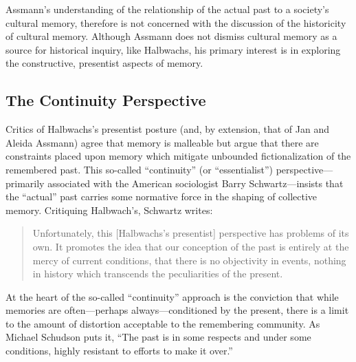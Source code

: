 Assmann's understanding of the relationship of the actual past to a
society's cultural memory, therefore is not concerned with the
discussion of the historicity of cultural memory. Although Assmann does
not dismiss cultural memory as a source for historical inquiry, like
Halbwachs, his primary interest is in exploring the constructive,
presentist aspects of memory.

\hypertarget{the-continuity-perspective}{%
\subsection{The Continuity
Perspective}\label{the-continuity-perspective}}

Critics of Halbwachs's presentist posture (and, by extension, that of
Jan and Aleida Assmann) agree that memory is malleable but argue that
there are constraints placed upon memory which mitigate unbounded
fictionalization of the remembered past. This so-called ``continuity''
(or ``essentialist'') perspective---primarily associated with the
American sociologist Barry Schwartz---insists that the ``actual'' past
carries some normative force in the shaping of collective
memory.\autocites[Schwartz has made numerous contributions to the field
of memory studies. See
esp.][]{schwartz_sf1982}{schwartz_asr1991}[and][]{schwartz2000}[Note
also the SBL volume specifically interacting with his
work:][]{thatcher2014} Critiquing Halbwach's, Schwartz writes:

\begin{quote}
Unfortunately, this {[}Halbwachs's presentist{]} perspective has
problems of its own. It promotes the idea that our conception of the
past is entirely at the mercy of current conditions, that there is no
objectivity in events, nothing in history which transcends the
peculiarities of the present.\autocite[376]{schwartz_sf1982}
\end{quote}

At the heart of the so-called ``continuity'' approach is the conviction
that while memories are often---perhaps always---conditioned by the
present, there is a limit to the amount of distortion acceptable to the
remembering community. As Michael Schudson puts it, ``The past is in
some respects and under some conditions, highly resistant to efforts to
make it over.''\autocite[107]{schudson_communication1989}

